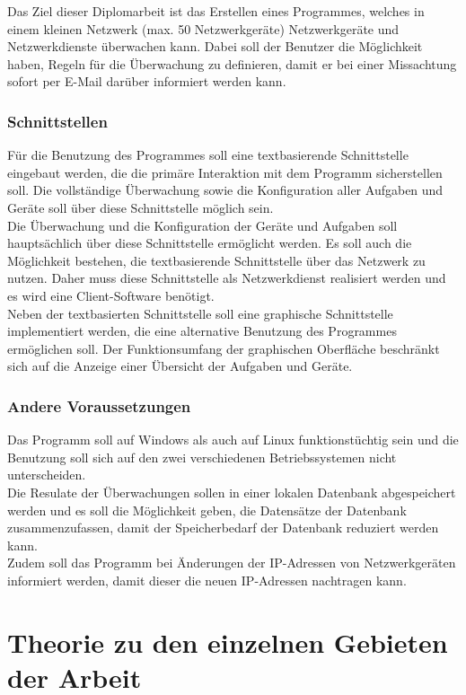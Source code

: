\documentclass[12pt,a4paper]{report}
\begin{document}
\begin{onehalfspace}
Das Ziel dieser Diplomarbeit ist das Erstellen eines Programmes, welches in einem kleinen Netzwerk (max. 50 Netzwerkgeräte) Netzwerkgeräte und Netzwerkdienste überwachen kann. Dabei soll der Benutzer die Möglichkeit haben, Regeln für die Überwachung zu definieren, damit er bei einer Missachtung sofort per E-Mail darüber informiert werden kann.

\section{Schnittstellen}

Für die Benutzung des Programmes soll eine textbasierende Schnittstelle eingebaut werden, die die primäre Interaktion mit dem Programm sicherstellen soll. Die vollständige Überwachung sowie die Konfiguration aller Aufgaben und Geräte soll über diese Schnittstelle möglich sein.\\
Die Überwachung und die Konfiguration der Geräte und Aufgaben soll hauptsächlich über diese Schnittstelle ermöglicht werden.
Es soll auch die Möglichkeit bestehen, die textbasierende Schnittstelle über das Netzwerk zu nutzen. Daher muss diese Schnittstelle als Netzwerkdienst realisiert werden und es wird eine Client-Software benötigt.\\
Neben der textbasierten Schnittstelle soll eine graphische Schnittstelle implementiert werden, die eine alternative Benutzung des Programmes ermöglichen soll. Der Funktionsumfang der graphischen Oberfläche beschränkt sich auf die Anzeige einer Übersicht der Aufgaben und Geräte.

\section{Andere Voraussetzungen}

Das Programm soll auf Windows als auch auf Linux funktionstüchtig sein und die Benutzung soll sich auf den zwei verschiedenen Betriebssystemen nicht unterscheiden.\\
Die Resulate der Überwachungen sollen in einer lokalen Datenbank abgespeichert werden und es soll die Möglichkeit geben, die Datensätze der Datenbank zusammenzufassen, damit der Speicherbedarf der Datenbank reduziert werden kann.\\
Zudem soll das Programm bei Änderungen der IP-Adressen von Netzwerkgeräten informiert werden, damit dieser die neuen IP-Adressen nachtragen kann.

\part{Theorie zu den einzelnen Gebieten der Arbeit}


\end{onehalfspace}
\end{document}
